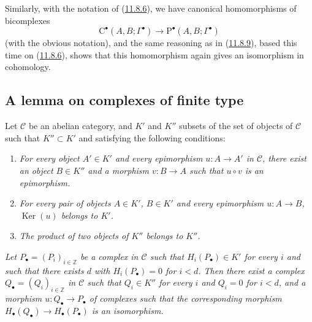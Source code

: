\begin{env}[11.8.10]
\label{0.11.8.10}
Similarly, with the notation of (\hyperref[0.11.8.6]{11.8.6}), we have
canonical homomorphisms of bicomplexes
\[
\mathrm C^\bullet(A,B;\Gamma^\bullet)\longrightarrow
\mathrm P^\bullet(A,B;\Gamma^\bullet)
\]
(with the obvious notation), and the same reasoning as in
(\hyperref[0.11.8.9]{11.8.9}), based this time on
(\hyperref[0.11.8.6]{11.8.6}), shows that this homomorphism again gives
an isomorphism in cohomology.
\end{env}

\subsection{A lemma on complexes of finite type}
\label{subsection:0.11.9}

\begin{proposition}[11.9.1]
\label{0.11.9.1}
Let $\mathcal C$ be an abelian category, and $K'$ and $K''$ subsets of
the set of objects of $\mathcal C$ such that $K''\subset K'$ and
satisfying the following conditions:
\begin{enumerate}
\item[{\rm(i)}] \emph{For every object $A'\in K'$ and every epimorphism
$u:A\to A'$ in $\mathcal C$, there exist an object $B\in K''$ and a morphism
$v:B\to A$ such that $u\circ v$ is an epimorphism.}
\item[{\rm(ii)}] \emph{For every pair of objects $A\in K'$, $B\in K'$ and
every epimorphism $u:A\to B$, $\operatorname{Ker}(u)$ belongs to $K'$.}
\item[{\rm(iii)}] \emph{The product of two objects of $K''$ belongs to
$K''$.}
\end{enumerate}
\emph{Let $P_\bullet=(P_i)_{i\in\mathbb Z}$ be a complex in $\mathcal C$
such that $H_i(P_\bullet)\in K'$ for every $i$ and such that there exists $d$
with $H_i(P_\bullet)=0$ for $i<d$. Then there exist a complex
$Q_\bullet=(Q_i)_{i\in\mathbb Z}$ in $\mathcal C$ such that $Q_i\in K''$
for every $i$ and $Q_i=0$ for $i<d$, and a morphism
$u:Q_\bullet\to P_\bullet$ of complexes such that the corresponding morphism
$H_\bullet(Q_\bullet)\to H_\bullet(P_\bullet)$ is an isomorphism.}
\end{proposition}

